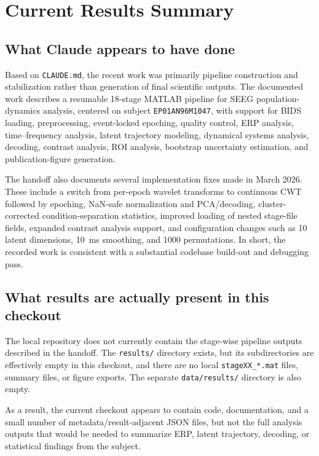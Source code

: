 \section*{Current Results Summary}

\subsection*{What Claude appears to have done}

Based on \texttt{CLAUDE.md}, the recent work was primarily pipeline construction and stabilization rather than generation of final scientific outputs. The documented work describes a resumable 18-stage MATLAB pipeline for SEEG population-dynamics analysis, centered on subject \texttt{EP01AN96M1047}, with support for BIDS loading, preprocessing, event-locked epoching, quality control, ERP analysis, time--frequency analysis, latent trajectory modeling, dynamical systems analysis, decoding, contrast analysis, ROI analysis, bootstrap uncertainty estimation, and publication-figure generation.

The handoff also documents several implementation fixes made in March 2026. These include a switch from per-epoch wavelet transforms to continuous CWT followed by epoching, NaN-safe normalization and PCA/decoding, cluster-corrected condition-separation statistics, improved loading of nested stage-file fields, expanded contrast analysis support, and configuration changes such as 10 latent dimensions, 10~ms smoothing, and 1000 permutations. In short, the recorded work is consistent with a substantial codebase build-out and debugging pass.

\subsection*{What results are actually present in this checkout}

The local repository does not currently contain the stage-wise pipeline outputs described in the handoff. The \texttt{results/} directory exists, but its subdirectories are effectively empty in this checkout, and there are no local \texttt{stageXX\_*.mat} files, summary files, or figure exports. The separate \texttt{data/results/} directory is also empty.

As a result, the current checkout appears to contain code, documentation, and a small number of metadata/result-adjacent JSON files, but not the full analysis outputs that would be needed to summarize ERP, latent trajectory, decoding, or statistical findings from the subject.

